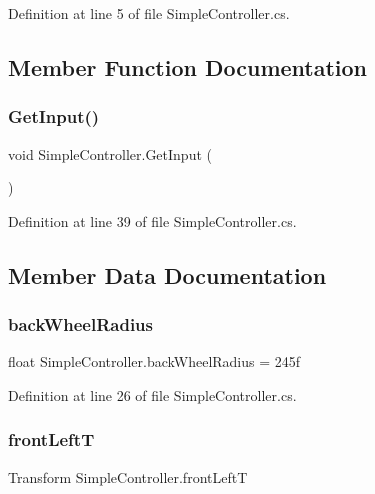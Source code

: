 Definition at line 5 of file Simple\+Controller.\+cs.



\subsection{Member Function Documentation}
\mbox{\label{class_simple_controller_a70c61e7f2a95c10edd81fd9eed5b85bb}} 
\subsubsection{\texorpdfstring{Get\+Input()}{GetInput()}}
{\footnotesize\ttfamily void Simple\+Controller.\+Get\+Input (\begin{DoxyParamCaption}{ }\end{DoxyParamCaption})}



Definition at line 39 of file Simple\+Controller.\+cs.



\subsection{Member Data Documentation}
\mbox{\label{class_simple_controller_ae11fe8f1c7ae299735498f8152993b3e}} 
\subsubsection{\texorpdfstring{back\+Wheel\+Radius}{backWheelRadius}}
{\footnotesize\ttfamily float Simple\+Controller.\+back\+Wheel\+Radius = 245f}



Definition at line 26 of file Simple\+Controller.\+cs.

\mbox{\label{class_simple_controller_a3e884631e0b2702aed7280aeb7d1318b}} 
\subsubsection{\texorpdfstring{front\+LeftT}{frontLeftT}}
{\footnotesize\ttfamily Transform Simple\+Controller.\+front\+LeftT}




